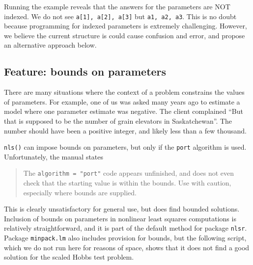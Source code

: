 \documentclass[
]{article}
\begin{document}
Running the example reveals that the answers for the parameters are NOT
indexed. We do not see \texttt{a{[}1{]},\ a{[}2{]},\ a{[}3{]}} but
\texttt{a1,\ a2,\ a3}. This is no doubt because programming for indexed
parameters is extremely challenging. However, we believe the current
structure is could cause confusion and error, and propose an alternative
approach below.

\hypertarget{feature-bounds-on-parameters}{%
\subsection{Feature: bounds on
parameters}\label{feature-bounds-on-parameters}}

There are many situations where the context of a problem constrains the
values of parameters. For example, one of us was asked many years ago to
estimate a model where one parameter estimate was negative. The client
complained ``But that is supposed to be the number of grain elevators in
Saskatchewan''. The number should have been a positive integer, and
likely less than a few thousand.

\texttt{nls()} can impose bounds on parameters, but only if the
\texttt{port} algorithm is used. Unfortunately, the manual states

\begin{quote}
The \texttt{algorithm\ =\ "port"} code appears unfinished, and does not
even check that the starting value is within the bounds. Use with
caution, especially where bounds are supplied.
\end{quote}

This is clearly unsatisfactory for general use, but does find bounded
solutions. Inclusion of bounds on parameters in nonlinear least squares
computations is relatively straightforward, and it is part of the
default method for package \texttt{nlsr}. Package \texttt{minpack.lm}
also includes provision for bounds, but the following script, which we
do not run here for reasons of space, shows that it does not find a good
solution for the scaled Hobbs test problem.
\end{document}
